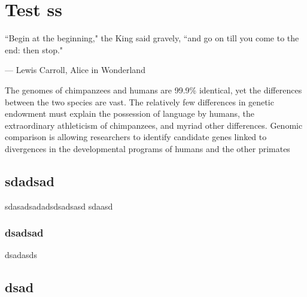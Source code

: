 \chapter{Test ss}
 
    \epigraph{``Begin at the beginning," the King said gravely, ``and go on till you come to the end: then stop."}{--- \textup{Lewis Carroll}, Alice in Wonderland}

    The genomes of chimpanzees and humans are 99.9\% identical, yet the differences between the two species are vast. The relatively few differences in genetic endowment must explain the possession of language by humans, the extraordinary athleticism of chimpanzees, and myriad other differences. Genomic comparison is allowing researchers to identify candidate genes linked to divergences in the developmental programs of humans and the other primates



    \section{sdadsad}
    sdasadsadadsdsadsasd sdaasd
    \lipsum[1-3]
    \subsection{dsadsad}
    dsadasds
    \lipsum[1-4]
    \section{dsad}
    \lipsum[2-6]

    
